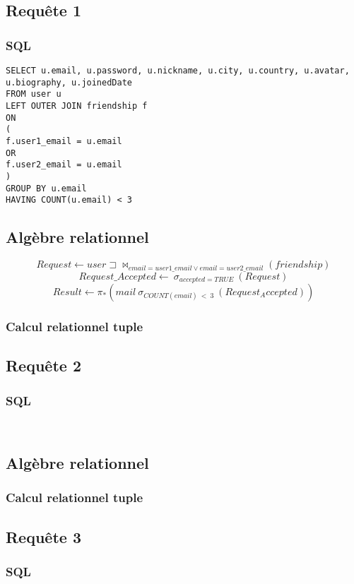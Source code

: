 \documentclass[a4paper,10pt]{article}
\begin{document}
\subsection{Requête 1}
\subsubsection{SQL}
\begin{verbatim}
SELECT u.email, u.password, u.nickname, u.city, u.country, u.avatar, u.biography, u.joinedDate 
FROM user u
LEFT OUTER JOIN friendship f
ON
(
f.user1_email = u.email 
OR 
f.user2_email = u.email
)
GROUP BY u.email
HAVING COUNT(u.email) < 3
\end{verbatim}
\subsection{Algèbre relationnel}
$$Request \leftarrow user\sqsupset\Join_{email=user1\_email \vee email=user2\_email}( friendship)$$
$$Request\_Accepted \leftarrow\ \sigma_{accepted=TRUE}\ (Request)$$
$$Result \leftarrow \pi_* (mail\ \sigma_{COUNT(email)\ <\ 3}\ (Request_Accepted) )$$
\subsubsection{Calcul relationnel tuple}


\subsection{Requête 2}
\subsubsection{SQL}
\begin{verbatim}


\end{verbatim}
\subsection{Algèbre relationnel}

\subsubsection{Calcul relationnel tuple}

\subsection{Requête 3}
\subsubsection{SQL}
\begin{verbatim}


\end{verbatim}
\end{document}
